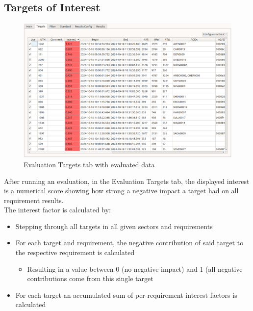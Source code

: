 \subsection{Targets of Interest}
\label{sec:eval_targets_of_interest}

\begin{figure}[H]
  \hspace*{-2cm}
    \includegraphics[width=18cm,frame]{figures/eval_targets_eval.png}
  \caption{Evaluation Targets tab with evaluated data}
\end{figure}

After running an evaluation, in the Evaluation Targets tab, the displayed interest is a numerical score showing how strong a negative impact a target had on all requirement results. \\

The interest factor is calculated by:
\begin{itemize}  
\item Stepping through all targets in all given sectors and requirements
\item For each target and requirement, the negative contribution of said target to the respective requirement is calculated
\begin{itemize}  
\item Resulting in a value between 0 (no negative impact) and 1 (all negative contributions come from this single target
\end{itemize}
\item For each target an accumulated sum of per-requirement interest factors is calculated
\end{itemize}
\ \\

